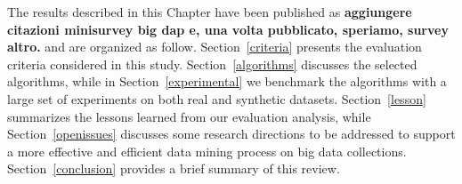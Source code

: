 The results described in this Chapter have been published as \textbf{aggiungere citazioni minisurvey big dap e, una volta pubblicato, speriamo, survey altro.} and are organized as follow. Section~\ref{criteria} presents the
evaluation criteria considered in this study. Section~\ref{algorithms} discusses
the selected algorithms, while in
Section~\ref{experimental} we benchmark the algorithms with a large set of
experiments on both real and synthetic datasets.
Section~\ref{lesson} summarizes the lessons learned from our evaluation
analysis, while Section~\ref{openissues} discusses some research directions to
be addressed to support a more effective and efficient data mining process on
big data collections. Section~\ref{conclusion} provides a brief summary of this
review.

